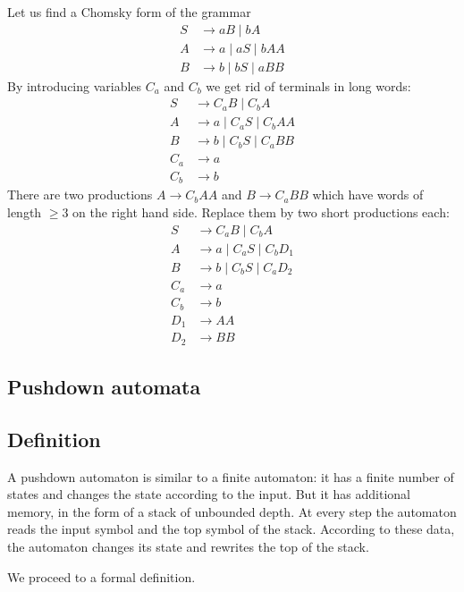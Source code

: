 \begin{page}

\begin{exl}
Let us find a Chomsky form of the grammar
\begin{align*}
S &\to aB \mid bA\\
A &\to a \mid aS \mid bAA\\
B &\to b \mid bS \mid aBB
\end{align*}
By introducing variables $C_a$ and $C_b$ we get rid of terminals in long words:
\begin{align*}
S &\to C_aB \mid C_bA\\
A &\to a \mid C_aS \mid C_bAA\\
B &\to b \mid C_bS \mid C_aBB\\
C_a &\to a\\
C_b &\to b
\end{align*}
There are two productions $A \to C_bAA$ and $B \to C_aBB$ which have words of length $\ge 3$ on the right hand side.
Replace them by two short productions each:
\begin{align*}
S &\to C_aB \mid C_bA\\
A &\to a \mid C_aS \mid C_bD_1\\
B &\to b \mid C_bS \mid C_aD_2\\
C_a &\to a\\
C_b &\to b\\
D_1 &\to AA\\
D_2 &\to BB
\end{align*}
\end{exl}

\end{page}

\begin{page}

\section{Pushdown automata}
\subsection{Definition}
A pushdown automaton is similar to a finite automaton:
it has a finite number of states and changes the state according to the input.
But it has additional memory, in the form of a stack of unbounded depth.
At every step the automaton reads the input symbol and the top symbol of the stack.
According to these data, the automaton changes its state and rewrites the top of the stack.

We proceed to a formal definition.

\end{page}

